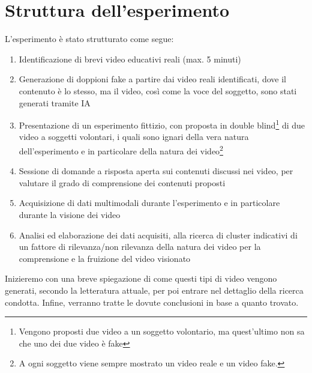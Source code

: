 \section*{Struttura dell'esperimento}

L'esperimento è stato strutturato come segue:
\begin{enumerate}
\item Identificazione di brevi video educativi reali (max. 5 minuti)
\item Generazione di doppioni fake a partire dai video reali identificati, dove il contenuto è lo stesso, ma il video, così come la voce del soggetto, sono stati generati tramite IA
\item Presentazione di un esperimento fittizio, con proposta in double blind\footnote{Vengono proposti due video a un soggetto volontario, ma quest'ultimo non sa che uno dei due video è fake} di due video a soggetti volontari, i quali sono ignari della vera natura dell'esperimento e in particolare della natura dei video\footnote{A ogni soggetto viene sempre mostrato un video reale e un video fake.}
\item Sessione di domande a risposta aperta sui contenuti discussi nei video, per valutare il grado di comprensione dei contenuti proposti
\item Acquisizione di dati multimodali durante l'esperimento e in particolare durante la visione dei video
\item Analisi ed elaborazione dei dati acquisiti, alla ricerca di cluster indicativi di un fattore di rilevanza/non rilevanza della natura dei video per la comprensione e la fruizione del video visionato
\end{enumerate}

Inizieremo con una breve spiegazione di come questi tipi di video vengono generati, secondo la letteratura attuale, per poi entrare nel dettaglio della ricerca condotta. Infine, verranno tratte le dovute conclusioni in base a quanto trovato.

\clearpage